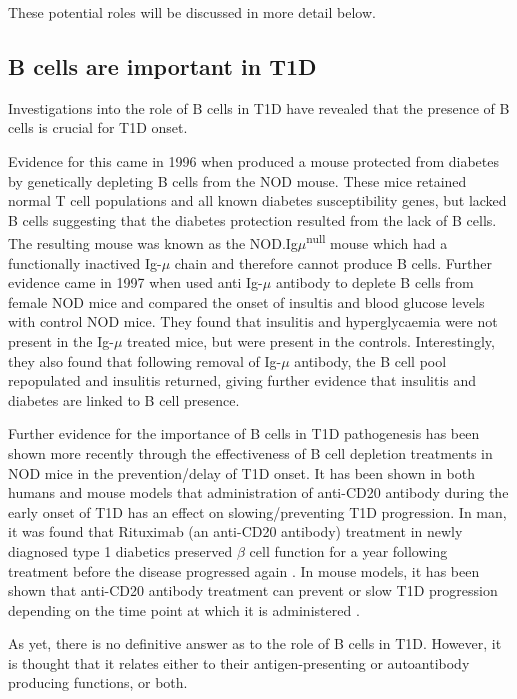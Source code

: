 These potential roles will be discussed in more detail below.

\subsection{B cells are important in T1D}

Investigations into the role of B cells in T1D have revealed that the presence of B cells is crucial for T1D onset.

Evidence for this came in 1996 when \citet{Serreze1996} produced a mouse protected from diabetes by genetically depleting B cells from the NOD mouse.
These mice retained normal T cell populations and all known diabetes susceptibility genes, but lacked B cells suggesting that the diabetes protection resulted from the lack of B cells.
The resulting mouse was known as the NOD.Ig$\mu$\textsuperscript{null} mouse which had a functionally inactived Ig-$\mu$ chain and therefore cannot produce B cells.
Further evidence came in 1997 when \citet{Noorchashm1997} used anti Ig-$\mu$ antibody to deplete B cells from female NOD mice and compared the onset of insultis and blood glucose levels with control NOD mice.
They found that insulitis and hyperglycaemia were not present in the Ig-$\mu$ treated mice, but were present in the controls.
Interestingly, they also found that following removal of Ig-$\mu$ antibody, the B cell pool repopulated and insulitis returned, giving further evidence that insulitis and diabetes are linked to B cell presence.

Further evidence for the importance of B cells in T1D pathogenesis has been shown more recently through the effectiveness of B cell depletion treatments in NOD mice in the prevention/delay of T1D onset.
It has been shown in both humans and mouse models that administration of anti-CD20 antibody during the early onset of T1D has an effect on slowing/preventing T1D progression.
In man, it was found that Rituximab (an anti-CD20 antibody) treatment in newly diagnosed type 1 diabetics preserved $\beta$ cell function for a year following treatment before the disease progressed again \citep{Pescovitz2009}.
In mouse models, it has been shown that anti-CD20 antibody treatment can prevent or slow T1D progression depending on the time point at which it is administered \citep{Xiu2008}.

As yet, there is no definitive answer as to the role of B cells in T1D.
However, it is thought that it relates either to their antigen-presenting or autoantibody producing functions, or both.


